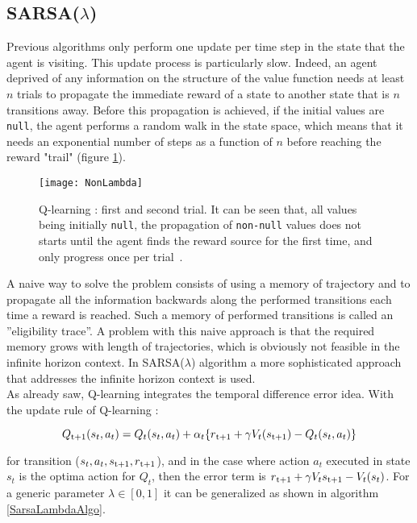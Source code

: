 \subsection{SARSA($\lambda$)} Previous algorithms only perform one update per time step in the state that the agent is visiting. This update process is particularly slow. Indeed, an agent deprived of any information on the structure of the value function needs at least $n$ trials to propagate the immediate reward of a state to another state that is $n$ transitions away. Before this propagation is achieved, if the initial values are {\tt null}, the agent performs a random walk in the state space, which means that it needs an exponential number of steps as a function of $n$ before reaching the reward "trail" (figure \ref{fig:NonLambda}).

\begin{figure}[h!]
	\centering
	\texttt{[image: NonLambda]}
	\caption{Q-learning : first and second trial. It can be seen that, all values being initially {\tt null}, the propagation of {\tt non-null} values does not starts until the agent finds the reward source for the first time, and only progress once per trial~\cite{Sigaud:2010:MDP:1841781}.}
	\label{fig:NonLambda}
\end{figure}

A naive way to solve the problem consists of using a memory of trajectory and to propagate all the information backwards along the performed transitions each time a reward is reached. Such a memory of performed transitions is called an ''eligibility trace''. A problem with this naive approach is that the required memory grows with length of trajectories, which is obviously not feasible in the infinite horizon context. In SARSA($\lambda$) algorithm a more sophisticated approach that addresses the infinite horizon context is used. \\

As already saw, Q-learning integrates the temporal difference error idea. With the update rule of Q-learning :

\begin{equation}
	Q\textsubscript{t+1} (s_t, a_t) = Q_t(s_t, a_t) + \alpha_t\{r\textsubscript{t+1} + \gamma V_t(s\textsubscript{t+1}) - Q_t(s_t, a_t)\}
\end{equation}

for transition ($s_t, a_t, s\textsubscript{t+1}, r\textsubscript{t+1}$), and in the case where action $a_t$ executed in state $s_t$ is the optima action for $Q_t$, then the error term is $r\textsubscript{t+1} + \gamma V_t s\textsubscript{t+1} - V_t(s_t)$. For a generic parameter $\lambda \in [0,1]$ it can be generalized as shown in algorithm \ref{SarsaLambdaAlgo}.

